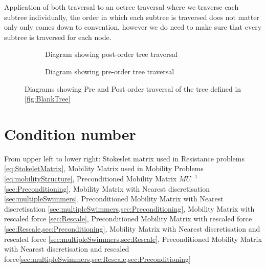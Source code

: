 Application of both traversal to an octree traversal where we traverse each subtree individually, the order in which each subtree is traversed does not matter only only comes down to convention, however we do need to make sure that every subtree is traversed for each node.


\begin{figure}
     \centering
     \begin{subfigure}[b]{0.49\textwidth}
         \centering
         \resizebox{\linewidth}{!}{}
         \caption{Diagram showing post-order tree traversal}
         \label{fig:Postorder}
     \end{subfigure}
          \hfill
     \begin{subfigure}[b]{0.49\textwidth}
         \centering
         \resizebox{\linewidth}{!}{}
         \caption{Diagram showing pre-order tree traversal}
         \label{fig:Preorder}
     \end{subfigure}
        \caption{Diagrams showing Pre and Post order traversal of the tree defined in \cref{fig:BlankTree}}
        \label{fig:TreeTraversal}
\end{figure}



\FloatBarrier
\section{Condition number}\label{appendix:ConNum}

From upper left to lower right: Stokeslet matrix used in Resistance problems \cref{eq:StokeletMatrix}, Mobility Matrix used in Mobility Problems \cref{eq:mobilityStructure}, Preconditioned Mobility Matrix $MU^{-1}$ \cref{sec:Preconditioning}, Mobility Matrix with Nearest discretisation \cref{sec:multipleSwimmers}, Preconditioned Mobility Matrix with Nearest discretisation \cref{sec:multipleSwimmers,sec:Preconditioning}, Mobility Matrix with rescaled force \cref{sec:Rescale}, Preconditioned Mobility Matrix with rescaled force \cref{sec:Rescale,sec:Preconditioning}, Mobility Matrix with Nearest discretisation and rescaled force \cref{sec:multipleSwimmers,sec:Rescale}, Preconditioned Mobility Matrix with Nearest discretisation and rescaled force\cref{sec:multipleSwimmers,sec:Rescale,sec:Preconditioning}

